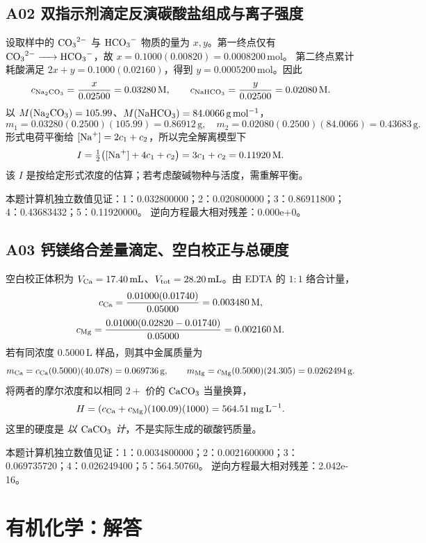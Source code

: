 \documentclass[UTF8,openany,11pt,a4paper]{ctexbook}
\begin{document}
\section{A02 \quad 双指示剂滴定反演碳酸盐组成与离子强度}
设取样中的 \(\ce{CO3^{2-}}\) 与 \(\ce{HCO3-}\) 物质的量为 \(x,y\)。第一终点仅有
\(\ce{CO3^{2-} -> HCO3-}\)，故 \(x=0.1000(0.00820)=0.0008200\,\mathrm{mol}\)。
第二终点累计耗酸满足 \(2x+y=0.1000(0.02160)\)，得到
\(y=0.0005200\,\mathrm{mol}\)。因此
\[
c_{\ce{Na2CO3}}=\frac{x}{0.02500}=0.03280\,\mathrm M,\qquad
c_{\ce{NaHCO3}}=\frac{y}{0.02500}=0.02080\,\mathrm M.
\]
以 \(M(\ce{Na2CO3})=105.99\)、\(M(\ce{NaHCO3})=84.0066\,\mathrm{g\,mol^{-1}}\)，
\[
m_1=0.03280(0.2500)(105.99)=0.86912\,\mathrm g,\quad
m_2=0.02080(0.2500)(84.0066)=0.43683\,\mathrm g.
\]
形式电荷平衡给 \([\ce{Na+}]=2c_1+c_2\)，所以完全解离模型下
\[
I=\tfrac12\bigl([\ce{Na+}]+4c_1+c_2\bigr)=3c_1+c_2
=0.11920\,\mathrm M.
\]
该 \(I\) 是按给定形式浓度的估算；若考虑酸碱物种与活度，需重解平衡。
\begin{reviewnote}
本题计算机独立数值见证：1：0.032800000；2：0.020800000；3：0.86911800；4：0.43683432；5：0.11920000。
逆向方程最大相对残差：0.000e+0。
\end{reviewnote}
\section{A03 \quad 钙镁络合差量滴定、空白校正与总硬度}
空白校正体积为 \(V_{\rm Ca}=17.40\,\mathrm{mL}\)、\(V_{\rm tot}=28.20\,\mathrm{mL}\)。由 EDTA 的 \(1:1\) 络合计量，
\[
c_{\rm Ca}=\frac{0.01000(0.01740)}{0.05000}
=0.003480\,\mathrm M,
\]
\[
c_{\rm Mg}=\frac{0.01000(0.02820-0.01740)}{0.05000}
=0.002160\,\mathrm M.
\]
若有同浓度 \(0.5000\,\mathrm L\) 样品，则其中金属质量为
\[
m_{\rm Ca}=c_{\rm Ca}(0.5000)(40.078)=0.069736\,\mathrm g,\qquad
m_{\rm Mg}=c_{\rm Mg}(0.5000)(24.305)=0.0262494\,\mathrm g.
\]
将两者的摩尔浓度和以相同 \(2+\) 价的 \(\ce{CaCO3}\) 当量换算，
\[
H=(c_{\rm Ca}+c_{\rm Mg})(100.09)(1000)
=564.51\,\mathrm{mg\,L^{-1}}.
\]
这里的硬度是 \emph{以 \(\ce{CaCO3}\) 计}，不是实际生成的碳酸钙质量。
\begin{reviewnote}
本题计算机独立数值见证：1：0.0034800000；2：0.0021600000；3：0.069735720；4：0.026249400；5：564.50760。
逆向方程最大相对残差：2.042e-16。
\end{reviewnote}
\chapter{有机化学：解答}
\end{document}

